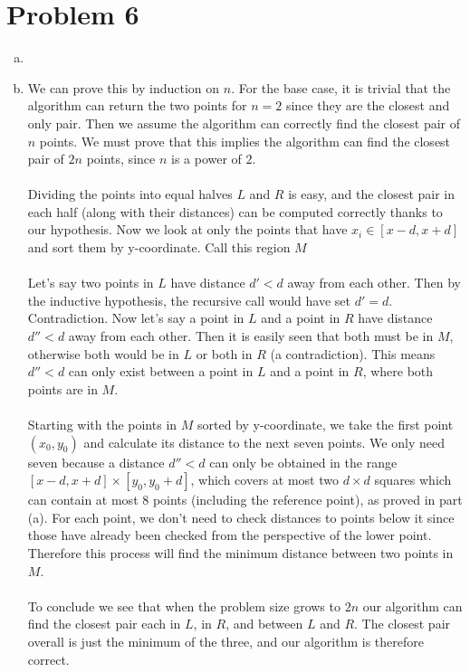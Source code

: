 \documentclass[11pt]{article}
\newcounter{problemnumber}
\begin{document}
\section*{Problem 6}
\begin{enumerate}[(a)]
\item
\item We can prove this by induction on $n$. For the base case, it is trivial that the algorithm can return the two points for $n=2$ since they are the closest and only pair. Then we assume the algorithm can correctly find the closest pair of $n$ points. We must prove that this implies the algorithm can find the closest pair of $2n$ points, since $n$ is a power of $2$. \\\\
Dividing the points into equal halves $L$ and $R$ is easy, and the closest pair in each half (along with their distances) can be computed correctly thanks to our hypothesis. Now we look at only the points that have $x_i \in [x-d,x+d]$ and sort them by y-coordinate. Call this region $M$ \\\\
Let's say two points in $L$ have distance $d'<d$ away from each other. Then by the inductive hypothesis, the recursive call would have set $d'=d$. Contradiction. Now let's say a point in $L$ and a point in $R$ have distance $d''<d$ away from each other. Then it is easily seen that both must be in $M$, otherwise both would be in $L$ or both in $R$ (a contradiction). This means $d''<d$ can only exist between a point in $L$ and a point in $R$, where both points are in $M$. \\\\
Starting with the points in $M$ sorted by y-coordinate, we take the first point $(x_0,y_0)$ and calculate its distance to the next seven points. We only need seven because a distance $d''<d$ can only be obtained in the range $[x-d,x+d]\times[y_0,y_0+d]$, which covers at most two $d\times d$ squares which can contain at most $8$ points (including the reference point), as proved in part (a). For each point, we don't need to check distances to points below it since those have already been checked from the perspective of the lower point. Therefore this process will find the minimum distance between two points in $M$. \\\\
To conclude we see that when the problem size grows to $2n$ our algorithm can find the closest pair each in $L$, in $R$, and between $L$ and $R$. The closest pair overall is just the minimum of the three, and our algorithm is therefore correct.

\end{enumerate}
\end{document}
